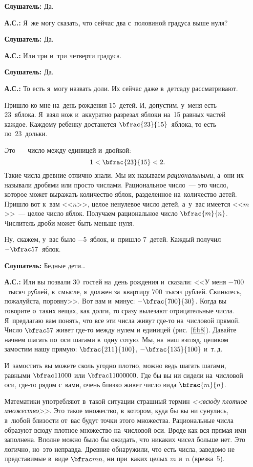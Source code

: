 \textbf{Слушатель:} Да.

\textbf{А.С.:} Я~же могу сказать, что сейчас два с~половиной градуса выше нуля?

\textbf{Слушатель:} Да.

\textbf{А.С.:} Или три и~три четверти градуса.

\textbf{Слушатель:} Да.

\textbf{А.С.:} То есть я~могу назвать доли. Их сейчас даже в~детсаду рассматривают.

Пришло ко мне на~день рождения 15~детей. И, допустим, у~меня есть 23~яблока. Я~взял нож и~аккуратно
разрезал яблоки на~15 равных частей каждое. Каждому ребенку достанется $\bfrac{23}{15}$~яблока, то есть
по~23~дольки.

Это~--- число между единицей и~двойкой:
$$
1<\bfrac{23}{15}< 2.
$$
Такие числа древние отлично знали. Мы их называем \textit{рациональными}, а~они их называли дробями или
просто числами. Рациональное число~--- это число, которое может выражать количество яблок,
разделенное на~количество детей. Пришло вот к~вам <<$n$>>, целое ненулевое число детей, а~у~вас
имеется <<$m$>>~--- целое число яблок. Получаем рациональное число $\bfrac{m}{n}$. Числитель дроби
может быть меньше нуля.

Ну, скажем, у~вас было $-5$~яблок, и~пришло 7~детей. Каждый получил $-\bfrac57$~яблок.

\textbf{Слушатель:} Бедные дети\ldots

\textbf{А.С.:} Или вы позвали 30~гостей на~день рождения и~сказали: <<У меня $-700$~тысяч рублей,
в~смысле, я~должен за~квартиру 700~тысяч рублей. Скиньтесь, пожалуйста, поровну>>. Вот вам и~минус:
$-\bfrac{700}{30}$. Когда вы говорите о~таких вещах, как долги, то сразу вылезают отрицательные числа.
Я~предлагаю вам понять, что все эти числа живут где-то на~числовой прямой. Число $\bfrac57$ живет где-то
между нулем и единицей (рис.~\ref{f:b8}). Давайте начнем шагать по~оси шагами в~одну сотую. Мы, на~наш
взгляд, целиком замостим нашу прямую: $\bfrac{211}{100}$, $-\bfrac{135}{100}$ и~т.\,д.



И~замостить вы можете сколь угодно плотно, можно ведь шагать шагами, равными $\bfrac1{1000}$ или $\bfrac1{1000000}$.
Где бы вы ни сидели на~числовой оси, где-то рядом с~вами, очень близко живет число вида $\bfrac{m}{n}$.

Математики употребляют в~такой ситуации страшный термин \textit{<<всюду плотное множество>>}. Это такое
множество, в~котором, куда бы вы ни сунулись, в~любой близости от~вас будут точки этого множества.
Рациональные числа образуют всюду плотное множество на~числовой оси. Вроде как вся прямая ими
заполнена. Вполне можно было бы ожидать, что никаких чисел больше нет. Это логично, но~это
неправда. Древние обнаружили, что есть числа, заведомо не представимые в~виде $\bfrac mn$, ни при~каких
целых $m$ и~$n$ (врезка~5).


